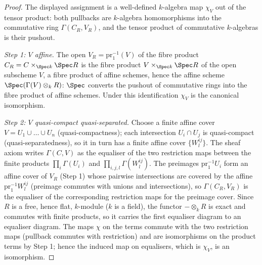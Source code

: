 \begin{proof}
  \leanok
  The displayed assignment is a well-defined \(k\)-algebra map \(\chi_V\) out of the
  tensor product: both pullbacks are \(k\)-algebra homomorphisms into the commutative
  ring \(\Gamma(C_R, V_R)\), and the tensor product of commutative \(k\)-algebras is
  their pushout.

  \emph{Step 1: \(V\) affine.} The open \(V_R = \mathrm{pr}_1^{-1}(V)\) of the fibre
  product \(C_R = C \times_{\Spec k} \Spec R\) is the fibre product
  \(V \times_{\Spec k} \Spec R\) of the open subscheme \(V\), a fibre product of affine
  schemes, hence the affine scheme \(\Spec(\Gamma(V) \otimes_k R)\): \(\Spec\) converts
  the pushout of commutative rings into the fibre product of affine schemes. Under this
  identification \(\chi_V\) is the canonical isomorphism.

  \emph{Step 2: \(V\) quasi-compact quasi-separated.} Choose a finite affine cover
  \(V = U_1 \cup \dots \cup U_n\) (quasi-compactness); each intersection
  \(U_i \cap U_j\) is quasi-compact (quasi-separatedness), so it in turn has a finite
  affine cover \(\{W^{ij}_l\}\). The sheaf axiom writes \(\Gamma(C, V)\) as the
  equaliser of the two restriction maps between the finite products
  \(\prod_i \Gamma(U_i)\) and \(\prod_{i,j,l} \Gamma(W^{ij}_l)\). The preimages
  \(\mathrm{pr}_1^{-1} U_i\) form an affine cover of \(V_R\) (Step 1) whose pairwise
  intersections are covered by the affine \(\mathrm{pr}_1^{-1} W^{ij}_l\) (preimage
  commutes with unions and intersections), so \(\Gamma(C_R, V_R)\) is the equaliser of
  the corresponding restriction maps for the preimage cover. Since \(R\) is a free,
  hence flat, \(k\)-module (\(k\) is a field), the functor \(- \otimes_k R\) is exact
  and commutes with finite products, so it carries the first equaliser diagram to an
  equaliser diagram. The maps \(\chi\) on the terms commute with the two restriction
  maps (pullback commutes with restriction) and are isomorphisms on the product terms by
  Step 1; hence the induced map on equalisers, which is \(\chi_V\), is an isomorphism.
\end{proof}

